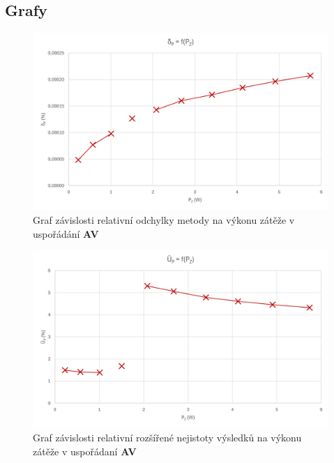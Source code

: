 \documentclass[a4paper, czech]{article}
\begin{document}
\subsection{Grafy}

\begin{figure}[H]
    \includegraphics[width = \textwidth]{graf_av1.png}
    \caption{Graf závislosti relativní odchylky metody na výkonu zátěže v uspořádání \textbf{AV}}
\end{figure}

\begin{figure}[H]
    \includegraphics[width = \textwidth]{graf_av2.png}
    \caption{Graf závislosti relativní rozšířené nejistoty výsledků na výkonu zátěže v uspořádaní \textbf{AV}}
\end{figure}
\end{document}
